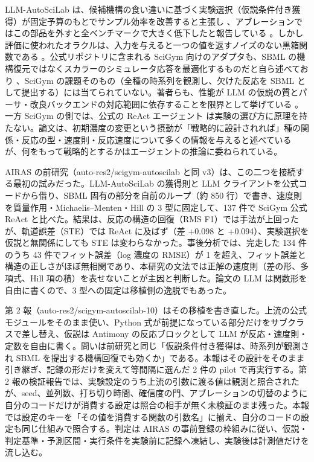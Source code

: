 \documentclass{article}
\providecommand{\unverified}[1]{#1}
\begin{document}
LLM-AutoSciLab は、候補機構の食い違いに基づく実験選択（仮説条件付き獲得）が固定予算のもとでサンプル効率を改善すると主張し \cite[s2.p2]{kabra-2026-llm}、アブレーションではこの部品を外すと全ベンチマークで大きく低下したと報告している \cite[s2.p7]{kabra-2026-llm}。しかし評価に使われたオラクルは、入力を与えると一つの値を返すノイズのない黒箱関数である \cite[s2.p5]{kabra-2026-llm}。公式リポジトリに含まれる SciGym 向けのアダプタも、SBML の機構復元ではなくスカラーのシミュレータ応答を最適化するものだと自ら述べており \cite[s2.p14]{kabra-2026-llm}、SciGym の課題そのもの（全種の時系列を観測し、欠けた反応を SBML として提出する）には当てられていない。著者らも、性能が LLM の仮説の質とパーサ・改良バックエンドの対応範囲に依存することを限界として挙げている \cite[s2.p8]{kabra-2026-llm}。一方 SciGym の側では、公式の ReAct エージェント \cite[s1.p3]{duan-2025-measuring} は実験の選び方に原理を持たない。論文は、初期濃度の変更という摂動が「戦略的に設計されれば」種の関係・反応の型・速度則・反応速度について多くの情報を与えると述べている \cite[s1.p8]{duan-2025-measuring} が、何をもって戦略的とするかはエージェントの推論に委ねられている。

AIRAS の前研究（auto-res2/scigym-autoscilab と同 v3）は、この二つを接続する最初の試みだった。LLM-AutoSciLab の獲得則と LLM クライアントを公式コードから借り、SBML 固有の部分を自前のループ（約 850 行）で書き、速度則を質量作用・Michaelis--Menten・Hill の 3 型に固定して、137 件で SciGym 公式 ReAct と比べた。結果は、反応の構造の回復（RMS F1）では手法が上回ったが、軌道誤差（STE）では ReAct に及ばず（差 \unverified{+0.098} と \unverified{+0.094}）、実験選択を仮説と無関係にしても STE は変わらなかった。事後分析では、完走した 134 件のうち 43 件でフィット誤差（log 濃度の RMSE）が 1 を超え、フィット誤差と構造の正しさがほぼ無相関であり、本研究の文法では正解の速度則（差の形、多項式、Hill 項の積）を表せないことが主因と判断した。論文の LLM は関数形を自由に書くので、3 型への固定は移植側の逸脱でもあった。

第 2 報（auto-res2/scigym-autoscilab-10）はその移植を書き直した。上流の公式モジュールをそのまま使い、Python 式が前提になっている部分だけをサブクラスで差し替え、仮説は Antimony の反応ブロックとして LLM が反応・速度則・定数を自由に書く。問いは前研究と同じ「仮説条件付き獲得は、時系列が観測され SBML を提出する機構回復でも効くか」である。本報はその設計をそのまま引き継ぎ、記録の形だけを変えて等間隔に選んだ 2 件の pilot で再実行する。第 2 報の検証報告では、実験設定のうち上流の引数に渡る値は観測と照合されたが、seed、並列数、打ち切り時間、確信度の門、アブレーションの切替のように自分のコードだけが消費する設定は照合の相手が無く未検証のまま残った。本報では設定のキーを「その値を消費する関数の引数名」に揃え、自分のコードの設定も同じ仕組みで照合する。判定は AIRAS の事前登録の枠組みに従い、仮説・判定基準・予測区間・実行条件を実験前に記録へ凍結し、実験後は計測値だけを流し込む。
\end{document}
